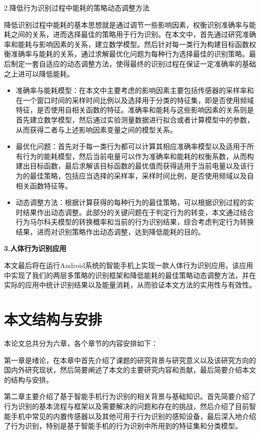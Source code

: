 \par 2.降低行为识别过程中能耗的策略动态调整方法

\par 降低识别过程中能耗的基本思想就是通过调节一些影响因素，权衡识别准确率与能耗之间的关系，进而选择最佳的策略用于行为识别。在本文中，首先通过研究准确率和能耗与影响因素的关系，建立数学模型。然后针对每一类行为构建目标函数权衡准确率与能耗的关系，通过求解最优化问题为每种行为选择最佳的识别策略。最后制定一套自适应的动态调整方法，使得最终的识别过程在保证一定准确率的基础之上进可以降低能耗。
\begin{itemize}
\item 准确率与能耗模型：在本文中主要考虑的影响因素主要包括传感器的采样率和在一个窗口时间的采样时间比例以及选择用于分类的特征集，即是否使用频域特征，是否使用自相关函数的特征。准确率和能耗与这些影响因素的关系则是首先建立数学模型，然后通过实验测量数据进行拟合或者计算模型中的参数，从而获得二者与上述影响因素变量之间的模型关系。
\item 最优化问题：首先对于每一类行为都可以计算其相应准确率模型以及适用于所有行为的能耗模型，然后当前电量可以作为准确率和能耗的权衡系数，从而构建出目标函数，最后求解该目标函数的最优值而获得适用于当前电量以及该行为的最佳策略，包括应当选择的采样率，采样时间比例，是否使用频域以及自相关函数特征等。
\item 动态调整方法：根据计算获得的每种行为的最佳策略，可以根据识别过程的实时结果作出动态调整。此部分的关键问题在于判定行为的转变，本文通过结合行为马尔科夫模型的转换概率和当前的行为识别结果，综合考虑判定行为转换结果，进而对识别策略作出动态调整，达到降低能耗的目的。
\end{itemize}

\textbf{3.人体行为识别应用
}
\par 本文最后将在运行Android系统的智能手机上实现一款人体行为识别应用，该应用中实现了我们的两层多策略的识别框架和降低能耗的最佳策略动态调整方法，并在实际的应用中统计识别结果以及能量消耗，从而验证本文方法的实用性与有效性。

\section{本文结构与安排}
\par 本论文总共分为六章，各个章节的内容安排如下：
\par 第一章是绪论，在本章中首先介绍了课题的研究背景与研究意义以及该研究方向的国内外研究现状，然后简要阐述了本文的主要研究内容和贡献，最后简要介绍本文的结构与安排。

\par 第二章主要介绍了基于智能手机行为识别的相关背景与基础知识。首先简要介绍了行为识别的基本流程与框架以及需要解决的问题和存在的挑战，然后介绍了目前智能手机中常见的内置传感器以及其他可用于行为识别的感知设备，最后深入地介绍了行为识别，特别是基于智能手机的行为识别中所用到的特征集和分类模型。

